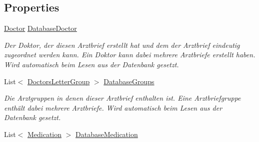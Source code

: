 \subsection*{Properties}
\begin{CompactItemize}
\item 
\hypertarget{classmy_m_d_1_1_model_1_1_data_model_1_1_doctors_letter_69695c2f690cea99f6f3810a92e2b071}{
\hyperlink{classmy_m_d_1_1_model_1_1_data_model_1_1_doctor}{Doctor} \hyperlink{classmy_m_d_1_1_model_1_1_data_model_1_1_doctors_letter_69695c2f690cea99f6f3810a92e2b071}{Database\-Doctor}}
\label{dc/d86/classmy_m_d_1_1_model_1_1_data_model_1_1_doctors_letter_69695c2f690cea99f6f3810a92e2b071}

\begin{CompactList}\small\item\em Der Doktor, der diesen Arztbrief erstellt hat und dem der Arztbrief eindeutig zugeordnet werden kann. Ein Doktor kann dabei mehrere Arztbriefe erstellt haben. Wird automatisch beim Lesen aus der Datenbank gesetzt. \item\end{CompactList}\item 
\hypertarget{classmy_m_d_1_1_model_1_1_data_model_1_1_doctors_letter_b32a1b3d31c25f3dd1108b15c169aa23}{
List$<$ \hyperlink{classmy_m_d_1_1_model_1_1_data_model_1_1_doctors_letter_group}{Doctors\-Letter\-Group} $>$ \hyperlink{classmy_m_d_1_1_model_1_1_data_model_1_1_doctors_letter_b32a1b3d31c25f3dd1108b15c169aa23}{Database\-Groups}}
\label{dc/d86/classmy_m_d_1_1_model_1_1_data_model_1_1_doctors_letter_b32a1b3d31c25f3dd1108b15c169aa23}

\begin{CompactList}\small\item\em Die Arztgruppen in denen dieser Arztbrief enthalten ist. Eine Arztbriefgruppe enth\"{a}lt dabei mehrere Arztbriefe. Wird automatisch beim Lesen aus der Datenbank gesetzt. \item\end{CompactList}\item 
\hypertarget{classmy_m_d_1_1_model_1_1_data_model_1_1_doctors_letter_3c07a2050bc1e19f7c84ade6aba5be24}{
List$<$ \hyperlink{classmy_m_d_1_1_model_1_1_data_model_1_1_medication}{Medication} $>$ \hyperlink{classmy_m_d_1_1_model_1_1_data_model_1_1_doctors_letter_3c07a2050bc1e19f7c84ade6aba5be24}{Database\-Medication}}
\label{dc/d86/classmy_m_d_1_1_model_1_1_data_model_1_1_doctors_letter_3c07a2050bc1e19f7c84ade6aba5be24}


\end{CompactItemize}
